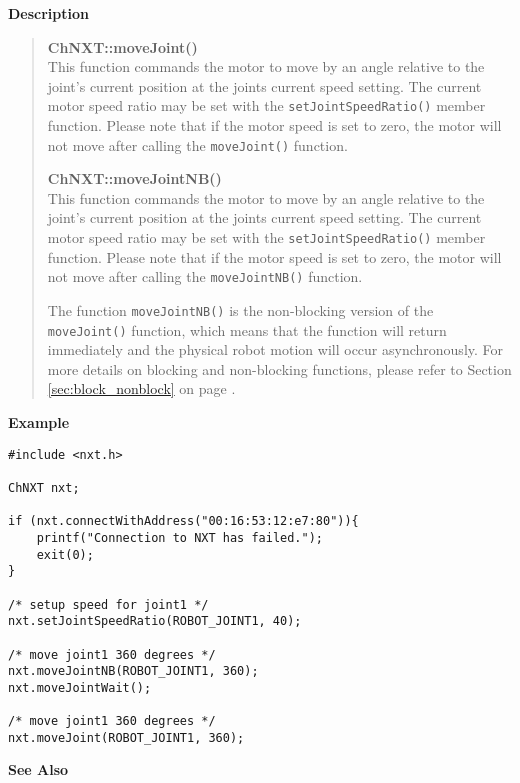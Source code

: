 \noindent
{\bf Description}\\
\vspace{-12pt}
\begin{quote}
{\bf ChNXT::moveJoint()}\\
This function commands the motor to move by an angle relative to 
the joint's current position at the joints current speed setting.
The current motor speed ratio may be set with the 
\texttt{setJointSpeedRatio()} member function. Please note that if
the motor speed is set to zero, the motor will not move after 
calling the \texttt{moveJoint()} function. 

{\bf ChNXT::moveJointNB()}\\
This function commands the motor to move by an angle relative to 
the joint's current position at the joints current speed setting.
The current motor speed ratio may be set with the
\texttt{setJointSpeedRatio()} member function. Please note that if
the motor speed is set to zero, the motor will not move after 
calling the \texttt{moveJointNB()} function. 

The function \texttt{moveJointNB()} is the non-blocking version of
the \texttt{moveJoint()} function, which means that the function 
will return immediately and the physical robot motion will occur 
asynchronously. For more details on blocking and non-blocking 
functions, please refer to Section \ref{sec:block_nonblock} on page 
\pageref{sec:block_nonblock}.\\
\end{quote}

\noindent
{\bf Example}
\begin{verbatim}
#include <nxt.h> 

ChNXT nxt;

if (nxt.connectWithAddress("00:16:53:12:e7:80")){
    printf("Connection to NXT has failed.");
    exit(0);
}
 
/* setup speed for joint1 */
nxt.setJointSpeedRatio(ROBOT_JOINT1, 40);

/* move joint1 360 degrees */
nxt.moveJointNB(ROBOT_JOINT1, 360);
nxt.moveJointWait();

/* move joint1 360 degrees */
nxt.moveJoint(ROBOT_JOINT1, 360);
\end{verbatim}

\noindent
{\bf See Also}\\
